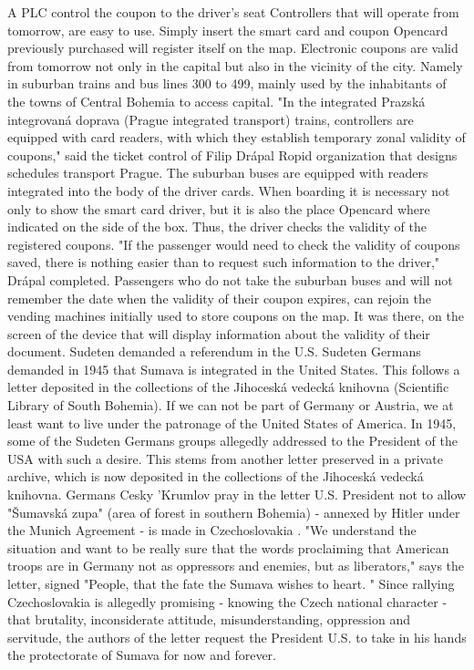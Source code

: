 A PLC control the coupon to the driver's seat
Controllers that will operate from tomorrow, are easy to use.
Simply insert the smart card and coupon Opencard previously purchased will register itself on the map.
Electronic coupons are valid from tomorrow not only in the capital but also in the vicinity of the city.
Namely in suburban trains and bus lines 300 to 499, mainly used by the inhabitants of the towns of Central Bohemia to access capital.
"In the integrated Prazská integrovaná doprava (Prague integrated transport) trains, controllers are equipped with card readers, with which they establish temporary zonal validity of coupons," said the ticket control of Filip Drápal Ropid organization that designs schedules transport Prague.
The suburban buses are equipped with readers integrated into the body of the driver cards.
When boarding it is necessary not only to show the smart card driver, but it is also the place Opencard where indicated on the side of the box.
Thus, the driver checks the validity of the registered coupons.
"If the passenger would need to check the validity of coupons saved, there is nothing easier than to request such information to the driver," Drápal completed.
Passengers who do not take the suburban buses and will not remember the date when the validity of their coupon expires, can rejoin the vending machines initially used to store coupons on the map.
It was there, on the screen of the device that will display information about the validity of their document.
Sudeten demanded a referendum in the U.S.
Sudeten Germans demanded in 1945 that Sumava is integrated in the United States.
This follows a letter deposited in the collections of the Jihoceská vedecká knihovna (Scientific Library of South Bohemia).
If we can not be part of Germany or Austria, we at least want to live under the patronage of the United States of America.
In 1945, some of the Sudeten Germans groups allegedly addressed to the President of the USA with such a desire.
This stems from another letter preserved in a private archive, which is now deposited in the collections of the Jihoceská vedecká knihovna.
Germans Cesky 'Krumlov pray in the letter U.S. President not to allow "Šumavská zupa" (area of ​​forest in southern Bohemia) - annexed by Hitler under the Munich Agreement - is made in Czechoslovakia .
"We understand the situation and want to be really sure that the words proclaiming that American troops are in Germany not as oppressors and enemies, but as liberators," says the letter, signed "People, that the fate the Sumava wishes to heart. "
Since rallying Czechoslovakia is allegedly promising - knowing the Czech national character - that brutality, inconsiderate attitude, misunderstanding, oppression and servitude, the authors of the letter request the President U.S. to take in his hands the protectorate of Sumava for now and forever.
